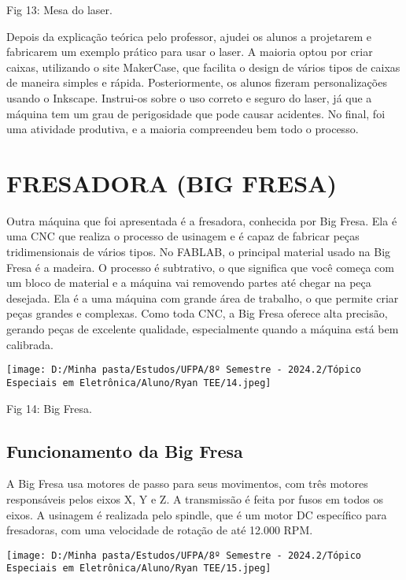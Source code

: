 \documentclass[
]{book}
\begin{document}
Fig 13: Mesa do laser.

Depois da explicação teórica pelo professor, ajudei os alunos a projetarem e fabricarem um exemplo prático para usar o laser. A maioria optou por criar caixas, utilizando o site MakerCase, que facilita o design de vários tipos de caixas de maneira simples e rápida. Posteriormente, os alunos fizeram personalizações usando o Inkscape. Instrui-os sobre o uso correto e seguro do laser, já que a máquina tem um grau de perigosidade que pode causar acidentes. No final, foi uma atividade produtiva, e a maioria compreendeu bem todo o processo.

\chapter{FRESADORA (BIG FRESA)}\label{fresadora-big-fresa}

Outra máquina que foi apresentada é a fresadora, conhecida por Big Fresa. Ela é uma CNC que realiza o processo de usinagem e é capaz de fabricar peças tridimensionais de vários tipos. No FABLAB, o principal material usado na Big Fresa é a madeira. O processo é subtrativo, o que significa que você começa com um bloco de material e a máquina vai removendo partes até chegar na peça desejada. Ela é a uma máquina com grande área de trabalho, o que permite criar peças grandes e complexas. Como toda CNC, a Big Fresa oferece alta precisão, gerando peças de excelente qualidade, especialmente quando a máquina está bem calibrada.

\texttt{[image: D:/Minha pasta/Estudos/UFPA/8º Semestre - 2024.2/Tópico Especiais em Eletrônica/Aluno/Ryan TEE/14.jpeg]}

Fig 14: Big Fresa.

\section{Funcionamento da Big Fresa}\label{funcionamento-da-big-fresa}

A Big Fresa usa motores de passo para seus movimentos, com três motores responsáveis pelos eixos X, Y e Z. A transmissão é feita por fusos em todos os eixos. A usinagem é realizada pelo spindle, que é um motor DC específico para fresadoras, com uma velocidade de rotação de até 12.000 RPM.

\texttt{[image: D:/Minha pasta/Estudos/UFPA/8º Semestre - 2024.2/Tópico Especiais em Eletrônica/Aluno/Ryan TEE/15.jpeg]}
\end{document}
